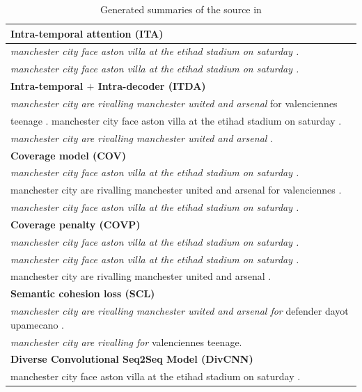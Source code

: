 \begin{table}[th!]
\begin{center}
\caption{\label{tab:strong_methods} Generated summaries of the source in }
\begin{tabular}{|l|}%

\hline \bf Intra-temporal attention (ITA) \\
\hline \textit{manchester city face aston villa at the etihad stadium on saturday .} \\
	   \textit{manchester city face aston villa at the etihad stadium on saturday .}\\
\hline \bf Intra-temporal $+$ Intra-decoder (ITDA) \\
\hline \textit{manchester city are rivalling manchester united and arsenal }for valenciennes\\
       teenage . manchester city face aston villa at the etihad stadium on saturday . \\
	   \textit{manchester city are rivalling manchester united and arsenal }. \\
\hline \bf Coverage model (COV) \\
\hline \textit{manchester city face aston villa at the etihad stadium on saturday .} \\
       manchester city are rivalling manchester united and arsenal for valenciennes . \\
	   \textit{manchester city face aston villa at the etihad stadium on saturday .}\\
\hline \bf Coverage penalty (COVP)\\
\hline \textit{manchester city face aston villa at the etihad stadium on saturday .}\\
       \textit{manchester city face aston villa at the etihad stadium on saturday .}\\
	   manchester city are rivalling manchester united and arsenal .\\
\hline \bf Semantic cohesion loss (SCL) \\
\hline \textit{manchester city are rivalling manchester united and arsenal for } defender dayot upamecano . \\
       \textit{manchester city are rivalling for} valenciennes teenage. \\
\hline \bf Diverse Convolutional Seq2Seq  Model (DivCNN) \\
\hline manchester city face aston villa at the etihad stadium on saturday . \\

\end{tabular}
\end{center}
\end{table}
